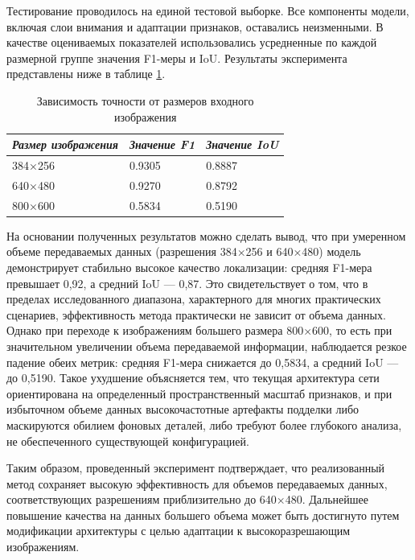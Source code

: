 Тестирование проводилось на единой тестовой выборке. Все компоненты модели, включая слои внимания и адаптации признаков, оставались неизменными. В качестве оцениваемых показателей использовались усредненные по каждой размерной группе значения F1-меры и IoU. Результаты эксперимента представлены ниже в таблице \ref{tab:size}.

\begin{table}[H]
    \centering
    \caption{Зависимость точности от размеров входного изображения}\label{tab:size}
    \begin{tabular}{|p{6cm}|p{4cm}|p{4cm}|}
        \hline
        \textit{Размер изображения} &\centering \textit{{Значение F1}} & \textit{Значение IoU}\\ \hline
        384×256 & 0.9305 & 0.8887\\ \hline
        640×480 & 0.9270 &  0.8792 \\ \hline
        800×600 & 0.5834 & 0.5190 \\ \hline
    \end{tabular}
\end{table}

На основании полученных результатов можно сделать вывод, что при умеренном объеме передаваемых данных (разрешения 384×256 и 640×480) модель демонстрирует стабильно высокое качество локализации: средняя F1-мера превышает 0,92, а средний IoU — 0,87. Это свидетельствует о том, что в пределах исследованного диапазона, характерного для многих практических сценариев, эффективность метода практически не зависит от объема данных. Однако при переходе к изображениям большего размера 800×600, то есть при значительном увеличении объема передаваемой информации, наблюдается резкое падение обеих метрик: средняя F1-мера снижается до 0,5834, а средний IoU — до 0,5190. Такое ухудшение объясняется тем, что текущая архитектура сети ориентирована на определенный пространственный масштаб признаков, и при избыточном объеме данных высокочастотные артефакты подделки либо маскируются обилием фоновых деталей, либо требуют более глубокого анализа, не обеспеченного существующей конфигурацией.

Таким образом, проведенный эксперимент подтверждает, что реализованный метод сохраняет высокую эффективность для объемов передаваемых данных, соответствующих разрешениям приблизительно до 640×480. Дальнейшее повышение качества на данных большего объема может быть достигнуто путем модификации архитектуры с целью адаптации к высокоразрешающим изображениям.

